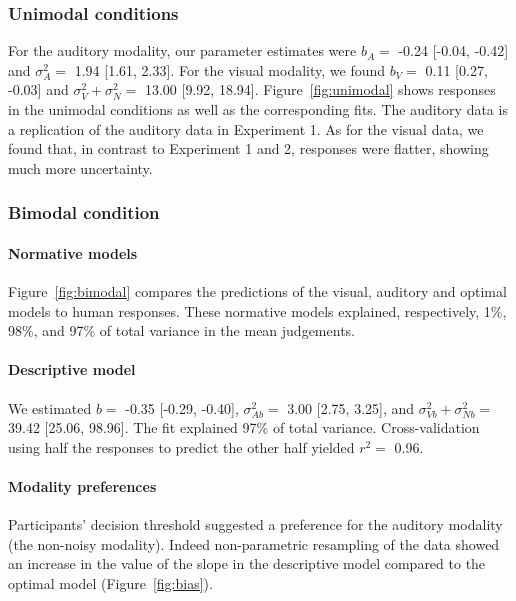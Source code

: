 \documentclass[english,,man,floatsintext]{apa6}
\let\oldparagraph\paragraph
\renewcommand{\paragraph}[1]{\oldparagraph{#1}\mbox{}}
\theoremstyle{definition}
\theoremstyle{definition}
\theoremstyle{definition}
\theoremstyle{remark}
\begin{document}
\subsubsection{Unimodal conditions}\label{unimodal-conditions-4}

For the auditory modality, our parameter estimates were \(b_A=\) -0.24
{[}-0.04, -0.42{]} and \(\sigma^2_A=\) 1.94 {[}1.61, 2.33{]}. For the
visual modality, we found \(b_V=\) 0.11 {[}0.27, -0.03{]} and
\(\sigma^2_V+\sigma^2_N=\) 13.00 {[}9.92, 18.94{]}.
Figure~\ref{fig:unimodal} shows responses in the unimodal conditions as
well as the corresponding fits. The auditory data is a replication of
the auditory data in Experiment 1. As for the visual data, we found
that, in contrast to Experiment 1 and 2, responses were flatter, showing
much more uncertainty.

\subsubsection{Bimodal condition}\label{bimodal-condition-3}

\paragraph{Normative models}\label{normative-models-2}

Figure~\ref{fig:bimodal} compares the predictions of the visual,
auditory and optimal models to human responses. These normative models
explained, respectively, 1\%, 98\%, and 97\% of total variance in the
mean judgements.

\paragraph{Descriptive model}\label{descriptive-model-2}

We estimated \(b=\) -0.35 {[}-0.29, -0.40{]}, \(\sigma^2_{Ab}=\) 3.00
{[}2.75, 3.25{]}, and \(\sigma^2_{Vb}+\sigma^2_{Nb}=\) 39.42 {[}25.06,
98.96{]}. The fit explained 97\% of total variance. Cross-validation
using half the responses to predict the other half yielded \(r^2=\)
0.96.

\paragraph{Modality preferences}\label{modality-preferences-1}

Participants' decision threshold suggested a preference for the auditory
modality (the non-noisy modality). Indeed non-parametric resampling of
the data showed an increase in the value of the slope in the descriptive
model compared to the optimal model (Figure~\ref{fig:bias}).
\end{document}
